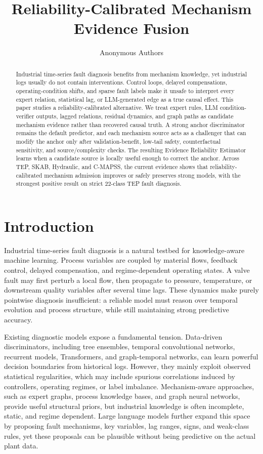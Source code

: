 \documentclass[letterpaper]{article}
\title{Reliability-Calibrated Mechanism Evidence Fusion}
\author{Anonymous Authors}
\begin{document}
\maketitle

\begin{abstract}
Industrial time-series fault diagnosis benefits from mechanism knowledge, yet industrial logs usually do not contain interventions. Control loops, delayed compensations, operating-condition shifts, and sparse fault labels make it unsafe to interpret every expert relation, statistical lag, or LLM-generated edge as a true causal effect. This paper studies a reliability-calibrated alternative. We treat expert rules, LLM condition-verifier outputs, lagged relations, residual dynamics, and graph paths as candidate mechanism evidence rather than recovered causal truth. A strong anchor discriminator remains the default predictor, and each mechanism source acts as a challenger that can modify the anchor only after validation-benefit, low-tail safety, counterfactual sensitivity, and source/complexity checks. The resulting Evidence Reliability Estimator learns when a candidate source is locally useful enough to correct the anchor. Across TEP, SKAB, Hydraulic, and C-MAPSS, the current evidence shows that reliability-calibrated mechanism admission improves or safely preserves strong models, with the strongest positive result on strict 22-class TEP fault diagnosis.
\end{abstract}

\section{Introduction}

Industrial time-series fault diagnosis is a natural testbed for knowledge-aware machine learning. Process variables are coupled by material flows, feedback control, delayed compensation, and regime-dependent operating states. A valve fault may first perturb a local flow, then propagate to pressure, temperature, or downstream quality variables after several time lags. These dynamics make purely pointwise diagnosis insufficient: a reliable model must reason over temporal evolution and process structure, while still maintaining strong predictive accuracy.

Existing diagnostic models expose a fundamental tension. Data-driven discriminators, including tree ensembles, temporal convolutional networks, recurrent models, Transformers, and graph-temporal networks, can learn powerful decision boundaries from historical logs. However, they mainly exploit observed statistical regularities, which may include spurious correlations induced by controllers, operating regimes, or label imbalance. Mechanism-aware approaches, such as expert graphs, process knowledge bases, and graph neural networks, provide useful structural priors, but industrial knowledge is often incomplete, static, and regime dependent. Large language models further expand this space by proposing fault mechanisms, key variables, lag ranges, signs, and weak-class rules, yet these proposals can be plausible without being predictive on the actual plant data.
\end{document}
